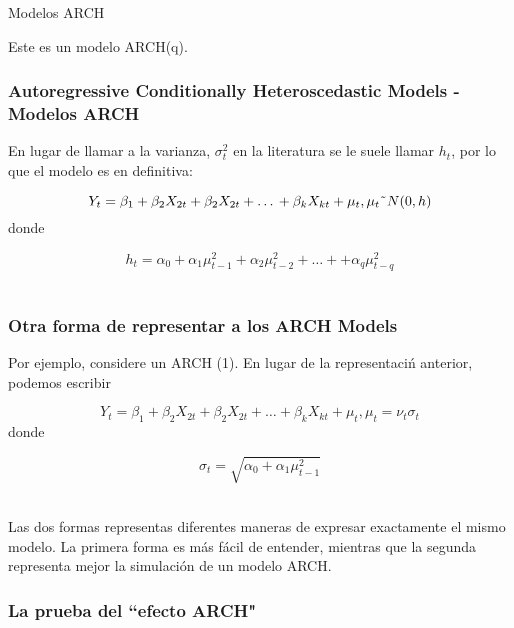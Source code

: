 \documentclass[xcolor=(list of options)]{beamer}
\begin{document}
\begin{section}{Modelos ARCH}
\begin{frame}
Este es un modelo ARCH(q).

\end{frame}

\begin{frame}
\frametitle{Autoregressive Conditionally Heteroscedastic Models - Modelos ARCH }

En lugar de llamar a la varianza, $\sigma^2_t$ en la literatura se le suele llamar $h_t$, por lo que el modelo es en definitiva:

\begin{equation}
Y_t = \beta_1 + \beta_2 X_{2t} + \beta_2 X_{2t} + \dots{} + \beta_k X_{kt} +\mu_t, \mu_t \string~N(0,h)
\end{equation}
\vspace{2mm}	
donde 

\begin{equation}
h_t = \alpha_0 + \alpha_1 \mu^2_{t-1} + \alpha_2 \mu^2_{t-2} + \dots{} + + \alpha_q \mu^2_{t-q}
\end{equation} 

\end{frame}

\begin{frame}
\frametitle{Otra forma de representar a los ARCH Models}

Por ejemplo, considere un ARCH (1). En lugar de la representaci\'n anterior, podemos escribir 

\begin{equation}
Y_t = \beta_1 + \beta_2 X_{2t} + \beta_2 X_{2t} + \dots{} + \beta_k X_{kt} +\mu_t, \mu_t =\nu_t \sigma_t
\end{equation}
\vspace{2mm}	
donde 

\begin{equation}
\sigma_t = \sqrt{\alpha_0 + \alpha_1 \mu^2_{t-1}}
\end{equation} 

Las dos formas representas diferentes maneras de expresar exactamente el mismo modelo. La primera forma es m\'as f\'acil de entender, mientras que la segunda representa mejor la simulaci\'on de un modelo ARCH.

\end{frame}

\begin{frame}
\frametitle{La prueba del ``efecto ARCH"}


\end{frame}
\end{section}
\end{document}
